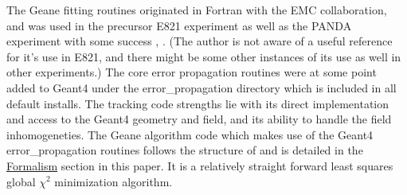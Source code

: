   The Geane fitting routines originated in Fortran with the EMC collaboration, and was used in the precursor E821 experiment as well as the PANDA experiment with some success \cite{geanemanual}, \cite{Lavezzi}. (The author is not aware of a useful reference for it's use in E821, and there might be some other instances of its use as well in other experiments.) The core error propagation routines were at some point added to Geant4 under the error\_propagation directory which is included in all default installs. The tracking code strengths lie with its direct implementation and access to the Geant4 geometry and field, and its ability to handle the field inhomogeneties. The Geane algorithm code which makes use of the Geant4 error\_propagation routines follows the structure of \cite{geanemanual} and is detailed in the \hyperref[sec:Formalism]{Formalism} section in this paper. It is a relatively straight forward least squares global $\chi^{2}$ minimization algorithm. 

